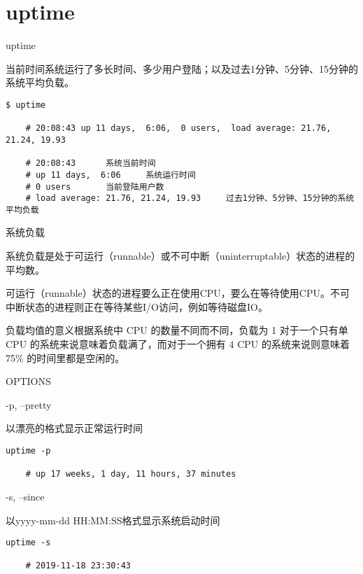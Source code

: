 \section{uptime}
\label{chap:linux_uptime}

uptime

当前时间系统运行了多长时间、多少用户登陆；以及过去1分钟、5分钟、15分钟的系统平均负载。

\begin{lstlisting}[language=cshell]
    $ uptime

    # 20:08:43 up 11 days,  6:06,  0 users,  load average: 21.76, 21.24, 19.93

    # 20:08:43      系统当前时间
    # up 11 days,  6:06     系统运行时间
    # 0 users       当前登陆用户数
    # load average: 21.76, 21.24, 19.93     过去1分钟、5分钟、15分钟的系统平均负载
\end{lstlisting}


系统负载

系统负载是处于可运行（runnable）或不可中断（uninterruptable）状态的进程的平均数。\par
可运行（runnable）状态的进程要么正在使用CPU，要么在等待使用CPU。不可中断状态的进程则正在等待某些I/O访问，例如等待磁盘IO。 \par
负载均值的意义根据系统中 CPU 的数量不同而不同，负载为 1 对于一个只有单 CPU 的系统来说意味着负载满了，而对于一个拥有 4 CPU 的系统来说则意味着 75\% 的时间里都是空闲的。


\par
OPTIONS

-p, --pretty \par
\qquad 以漂亮的格式显示正常运行时间

\begin{lstlisting}[language=cshell]
    uptime -p

    # up 17 weeks, 1 day, 11 hours, 37 minutes
\end{lstlisting}


-s, --since \par
\qquad 以yyyy-mm-dd HH:MM:SS格式显示系统启动时间

\begin{lstlisting}[language=cshell]
    uptime -s

    # 2019-11-18 23:30:43
\end{lstlisting}












